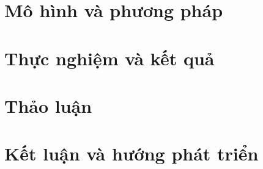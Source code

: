 \documentclass[twoside,final]{hcmut-report}
\begin{document}
\section{Mô hình và phương pháp}\label{sec:mo-hinh-phuong-phap}






% 

\clearpage
\section{Thực nghiệm và kết quả}\label{sec:thuc-nghiem-ket-qua}



\clearpage
\section{Thảo luận}\label{sec:thao-luan}



\clearpage
\section{Kết luận và hướng phát triển}\label{sec:ket-luan}



\clearpage


\nocite{*}
\end{document}
